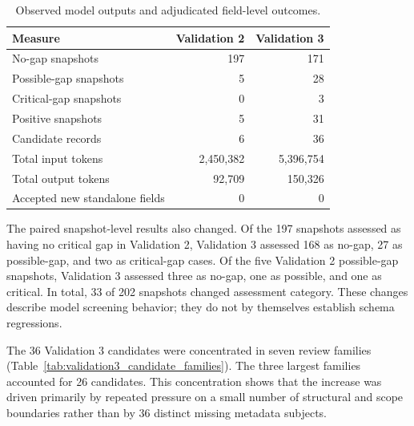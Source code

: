 \documentclass{article}
\begin{document}
\begin{table}[H]
    \centering
    \caption{Observed model outputs and adjudicated field-level outcomes.}
    \label{tab:validation2_validation3_results}
    \renewcommand{\arraystretch}{1.1}
    \small
    \begin{tabular}{lrr}
        \toprule
        \textbf{Measure} & \textbf{Validation 2} & \textbf{Validation 3} \\
        \midrule
        No-gap snapshots & 197 & 171 \\
        Possible-gap snapshots & 5 & 28 \\
        Critical-gap snapshots & 0 & 3 \\
        Positive snapshots & 5 & 31 \\
        Candidate records & 6 & 36 \\
        Total input tokens & 2,450,382 & 5,396,754 \\
        Total output tokens & 92,709 & 150,326 \\
        Accepted new standalone fields & 0 & 0 \\
        \bottomrule
    \end{tabular}
\end{table}

The paired snapshot-level results also changed. Of the 197 snapshots assessed as having no critical gap in Validation 2, Validation 3 assessed 168 as no-gap, 27 as possible-gap, and two as critical-gap cases. Of the five Validation 2 possible-gap snapshots, Validation 3 assessed three as no-gap, one as possible, and one as critical. In total, 33 of 202 snapshots changed assessment category. These changes describe model screening behavior; they do not by themselves establish schema regressions.

The 36 Validation 3 candidates were concentrated in seven review families (Table~\ref{tab:validation3_candidate_families}). The three largest families accounted for 26 candidates. This concentration shows that the increase was driven primarily by repeated pressure on a small number of structural and scope boundaries rather than by 36 distinct missing metadata subjects.
\end{document}

